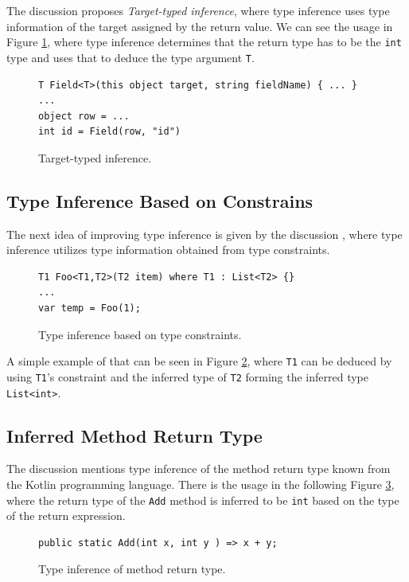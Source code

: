 The discussion \cite{online:RetTInference} proposes \textit{Target-typed inference}, where type inference uses type information of the target assigned by the return value. 
We can see the usage in Figure \ref{img62:RetTInf}, where type inference determines that the return type has to be the \texttt{int} type and uses that to deduce the type argument \texttt{T}.
\begin{figure}[h]
\begin{lstlisting}[style=csharp]
T Field<T>(this object target, string fieldName) { ... }
...
object row = ...
int id = Field(row, "id")
\end{lstlisting}
\caption{Target-typed inference.}
\label{img62:RetTInf}
\end{figure}

\subsection{Type Inference Based on Constrains} \label{sect11:is6}

The next idea of improving type inference is given by the discussion \cite{online:TInfConst}, where type inference utilizes type information obtained from type constraints.
\begin{figure}[b!]
\begin{lstlisting}[style=csharp]
T1 Foo<T1,T2>(T2 item) where T1 : List<T2> {}
...
var temp = Foo(1);
\end{lstlisting}
\caption{Type inference based on type constraints.}
\label{img23:TInfConst}
\end{figure}
A simple example of that can be seen in Figure \ref{img23:TInfConst}, where \texttt{T1} can be deduced by using \texttt{T1}'s constraint and the inferred type of \texttt{T2} forming the inferred type \texttt{List<int>}.

\newpage

\subsection{Inferred Method Return Type} \label{sect12:is7}

The discussion \cite{online:TMRetInf} mentions type inference of the method return type known from the Kotlin programming language.
There is the usage in the following Figure \ref{img24:TMRetInf}, where the return type of the \texttt{Add} method is inferred to be \texttt{int} based on the type of the return expression.
\begin{figure}[h!]
\begin{lstlisting}[style=csharp]
public static Add(int x, int y ) => x + y;
\end{lstlisting}
\caption{Type inference of method return type.}
\label{img24:TMRetInf}
\end{figure}

